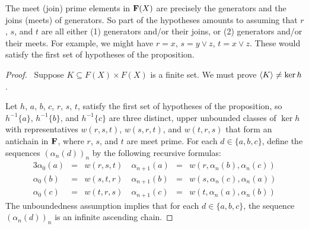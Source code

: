 \begin{remarks}
  The meet (join) prime elements in $\mathbf{F}(X)$ are precisely the generators and the 
  joins (meets) of generators. So part of the hypotheses amounts to assuming that 
  $r$, $s$, and $t$ are all either (1) generators and/or their joins, or (2) generators 
  and/or their meets.  For example, we might have $r = x$, $s = y \vee z$, $t = x \vee z$.
  These would satisfy the first set of hypotheses of the proposition.
\end{remarks}
\begin{proof}\
Suppose $K \subseteq F(X) \times F(X)$ is a finite set. 
We must prove $\langle K\rangle \neq \ker h$.

\medskip
{}
  Let $h$, $a$, $b$, $c$, $r$, $s$, $t$, satisfy the first set of hypotheses of the 
proposition, so $h^{-1}\{a\}$, $h^{-1}\{b\}$, and $h^{-1}\{c\}$ are three distinct, 
upper unbounded classes of $\ker h$ with representatives $w(r,s,t)$, $w(s,r,t)$, and 
$w(t,r,s)$ that form an antichain in $\mathbf{F}$, where $r$, $s$, and $t$ are meet 
prime.
For each $d\in \{a, b, c\}$, define the sequences $(\alpha_n(d))_n$
by the following recursive formulas:
\begin{alignat*}{3}
  \alpha_0(a)     &= & w(r,s,t) \quad 
  \alpha_{n+1}(a) &= & w(r,\alpha_n(b),\alpha_n(c))\\
  \alpha_0(b)     &= & w(s,t,r)\quad 
  \alpha_{n+1}(b) &= & w(s,\alpha_n(c),\alpha_n(a))\\
  \alpha_0(c)     &= & w(t,r,s)\quad  
  \alpha_{n+1}(c) &= & w(t,\alpha_n(a),\alpha_n(b))
\end{alignat*}
The unboundedness assumption implies that for each 
$d \in \{a,b,c\}$, the sequence $(\alpha_n(d))_n$ is
an infinite ascending chain.


\end{proof}
